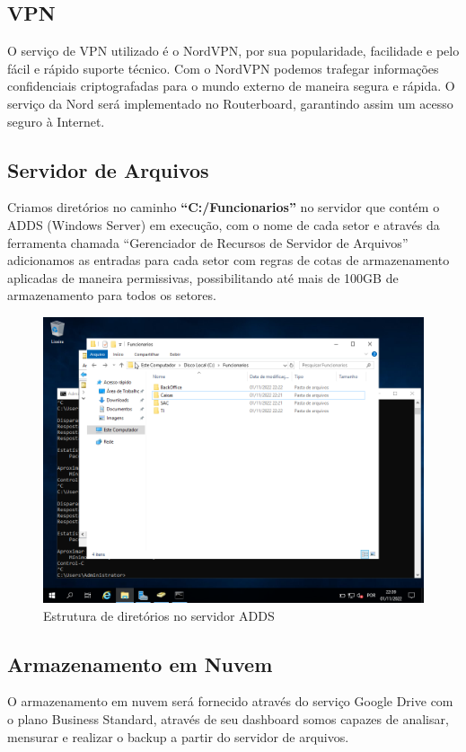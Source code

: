 \documentclass[12pt]{article}
\begin{document}
\subsection{VPN}
O serviço de VPN utilizado é o NordVPN, por sua popularidade, facilidade e pelo fácil e rápido suporte técnico. Com o NordVPN podemos trafegar informações confidenciais criptografadas para o mundo externo de maneira segura e rápida. O serviço da Nord será implementado no Routerboard, garantindo assim um acesso seguro à Internet.

\subsection{Servidor de Arquivos}
Criamos diretórios no caminho \textbf{“C:/Funcionarios”} no servidor que contém o ADDS (Windows Server) em execução, com o nome de cada setor e através da ferramenta chamada “Gerenciador de Recursos de Servidor de Arquivos” adicionamos as entradas para cada setor com regras de cotas de armazenamento aplicadas de maneira permissivas, possibilitando até mais de 100GB de armazenamento para todos os setores.

\begin{figure}[ht]
\centering
\includegraphics[height=0.5\textwidth]{adds-pasta-compartilhada.png}
\caption{Estrutura de diretórios no servidor ADDS}
\label{fig:adds-pastas}
\end{figure}

\subsection{Armazenamento em Nuvem}
O armazenamento em nuvem será fornecido através do serviço Google Drive com o plano Business Standard, através de seu dashboard somos capazes de analisar, mensurar e realizar o backup a partir do servidor de arquivos.
\end{document}
